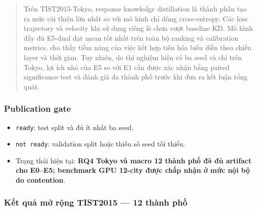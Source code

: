 \begin{quote}\small Trên TIST2015-Tokyo, response knowledge distillation là thành phần tạo ra mức cải thiện lớn nhất so với mô hình chỉ dùng cross-entropy. Các loss trajectory và velocity khi sử dụng riêng lẻ chưa vượt baseline KD. Mô hình đầy đủ E5-dual đạt mean tốt nhất trên toàn bộ ranking và calibration metrics, cho thấy tiềm năng của việc kết hợp tiến hóa biểu diễn theo chiều layer và thời gian. Tuy nhiên, do thí nghiệm hiện có ba seed và chỉ trên Tokyo, lợi ích nhỏ của E5 so với E1 cần được xác nhận bằng paired significance test và đánh giá đa thành phố trước khi đưa ra kết luận tổng quát.\end{quote}
\subsubsection*{Publication gate}

\begin{itemize}
\item \texttt{ready}: test split và đủ ít nhất ba seed.
\item \texttt{not ready}: validation split hoặc thiếu số seed tối thiểu.
\item Trạng thái hiện tại: \textbf{RQ4 Tokyo và macro 12 thành phố đã đủ artifact cho E0--E5; benchmark GPU 12-city được chấp nhận ở mức nội bộ do contention}.
\end{itemize}

\subsubsection*{Kết quả mở rộng TIST2015 --- 12 thành phố}

